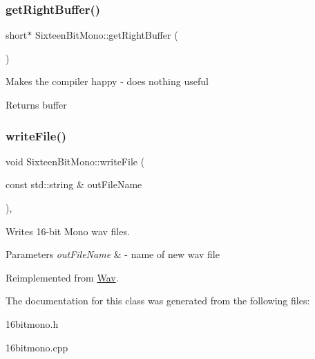 \subsubsection{\texorpdfstring{get\+Right\+Buffer()}{getRightBuffer()}}
{\footnotesize\ttfamily short$\ast$ Sixteen\+Bit\+Mono\+::get\+Right\+Buffer (\begin{DoxyParamCaption}{ }\end{DoxyParamCaption})\hspace{0.3cm}{\ttfamily [inline]}}

Makes the compiler happy -\/ does nothing useful

\begin{DoxyReturn}{Returns}
buffer 
\end{DoxyReturn}
\mbox{\label{classSixteenBitMono_a331ba2f00ff9614c1c0dc99ad6fb55f6}} 
\subsubsection{\texorpdfstring{write\+File()}{writeFile()}}
{\footnotesize\ttfamily void Sixteen\+Bit\+Mono\+::write\+File (\begin{DoxyParamCaption}\item[{const std\+::string \&}]{out\+File\+Name }\end{DoxyParamCaption})\hspace{0.3cm}{\ttfamily [override]}, {\ttfamily [virtual]}}

Writes 16-\/bit Mono wav files.


\begin{DoxyParams}{Parameters}
{\em out\+File\+Name} & -\/ name of new wav file \\
\hline
\end{DoxyParams}


Reimplemented from \hyperlink{classWav_a7bae34f37288c53cb113e76045f78098}{Wav}.



The documentation for this class was generated from the following files\+:\begin{DoxyCompactItemize}
\item 
16bitmono.\+h\item 
16bitmono.\+cpp\end{DoxyCompactItemize}
